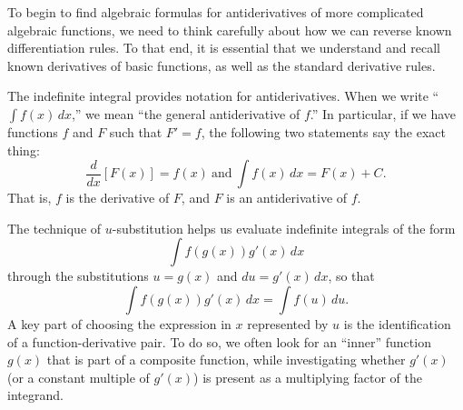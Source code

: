 

\newpage

\begin{summary}
\item To begin to find algebraic formulas for antiderivatives of more complicated algebraic functions, we need to think carefully about how we can reverse known differentiation rules.  To that end, it is essential that we understand and recall known derivatives of basic functions, as well as the standard derivative rules.

\item The indefinite integral provides notation for antiderivatives.  When we write ``$\int f(x) \, dx$,'' we mean ``the general antiderivative of $f$.''  In particular, if we have functions $f$ and $F$ such that $F' = f$, the following two statements say the exact thing:
\[ \frac{d}{dx}[F(x)] = f(x) \ \mbox{and} \ \int f(x) \, dx = F(x) + C. \]
That is, $f$ is the derivative of $F$, and $F$ is an antiderivative of $f$.

\item The technique of $u$-substitution helps us evaluate indefinite integrals of the form 
\[\int f(g(x))g'(x) \, dx\]
through the substitutions $u = g(x)$ and $du = g'(x) \, dx$, so that
\[ \int f(g(x))g'(x) \, dx = \int f(u) \, du. \]
A key part of choosing the expression in $x$ represented by $u$ is the identification of a function-derivative pair.  To do so, we often look for an ``inner'' function $g(x)$ that is part of a composite function, while investigating whether $g'(x)$ (or a constant multiple of $g'(x)$) is present as a multiplying factor of the integrand.
\end{summary}

\clearpage

 

\cleardoublepage